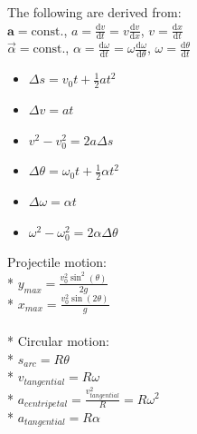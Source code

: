 The following are derived from:\\
\( \mathbf{a} = \mathrm{const.} \),  \(a = \frac{\mathrm{d}v}{\mathrm{d}t} =  v\frac{\mathrm{d}v}{\mathrm{d}x}  \),  \( v=\frac{\mathrm{d}x}{\mathrm{d}t} \)\\
\(  \vec{\alpha} = \mathrm{const.} \),  \(\alpha = \frac{\mathrm{d}\omega}{\mathrm{d}t} =  \omega\frac{\mathrm{d}\omega}{\mathrm{d}\theta}  \),  \( \omega=\frac{\mathrm{d}\theta}{\mathrm{d}t} \)
\begin{itemize}
\item \( \Delta s = v_0 t + \frac{1}{2} a t^{2} \)
\item \( \Delta v = a t \)
\item \( v^2 -  v_0^2 =  2a \Delta s \)
\item \( \Delta \theta = \omega_0 t + \frac{1}{2} \alpha t^{2} \)
\item \( \Delta \omega = \alpha t \)
\item \(  \omega^2 -   \omega_0^2 =  2\alpha \Delta \theta \)
\end{itemize}
Projectile motion:\\* \( y_{max}=\frac{v_0^2 \sin^2(\theta)}{2g} \)\\* \( x_{max}=\frac{v_0^2 \sin(2\theta)}{g} \)\\\\*
Circular motion:\\* \(s_{arc}=R\theta\)\\* \( v_{tangential}=R\omega \)\\* \(a_{centripetal}=\frac{v_{tangential}^2}{R}=R\omega^2\)\\* \( a_{tangential}=R\alpha \)

